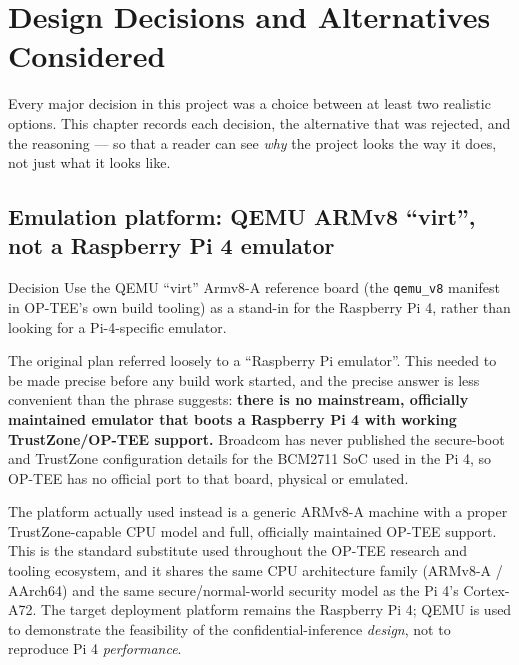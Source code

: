 \documentclass[11pt,a4paper]{report}
\newcommand{\code}[1]{\texttt{\small #1}}
\begin{document}
\chapter{Design Decisions and Alternatives Considered}
\label{ch:decisions}

Every major decision in this project was a choice between at least two realistic options. This
chapter records each decision, the alternative that was rejected, and the reasoning --- so that a
reader can see \emph{why} the project looks the way it does, not just what it looks like.

\section{Emulation platform: QEMU ARMv8 ``virt'', not a Raspberry Pi 4 emulator}
\label{sec:qemu-vs-pi4}

\begin{decisionbox}{Decision}
Use the QEMU ``virt'' Armv8-A reference board (the \code{qemu\_v8} manifest in OP-TEE's own build
tooling) as a stand-in for the Raspberry Pi 4, rather than looking for a Pi-4-specific emulator.
\end{decisionbox}

The original plan referred loosely to a ``Raspberry Pi emulator''. This needed to be made precise
before any build work started, and the precise answer is less convenient than the phrase suggests:
\textbf{there is no mainstream, officially maintained emulator that boots a Raspberry Pi 4 with
working TrustZone/OP-TEE support.} Broadcom has never published the secure-boot and TrustZone
configuration details for the BCM2711 SoC used in the Pi 4, so OP-TEE has no official port to that
board, physical or emulated.

The platform actually used instead is a generic ARMv8-A machine with a proper TrustZone-capable
CPU model and full, officially maintained OP-TEE support. This is the standard substitute used
throughout the OP-TEE research and tooling ecosystem, and it shares the same CPU architecture
family (ARMv8-A / AArch64) and the same secure/normal-world security model as the Pi 4's
Cortex-A72. The target deployment platform remains the Raspberry Pi 4; QEMU is used to demonstrate
the feasibility of the confidential-inference \emph{design}, not to reproduce Pi 4
\emph{performance}.
\end{document}
